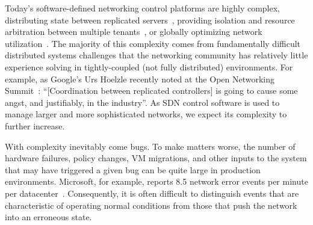 
Today's software-defined networking control platforms are highly complex,
distributing state between replicated
servers~\cite{floodlight},
providing isolation and resource arbitration between multiple
tenants~\cite{Casado:2010:VNF:1921151.1921162}, or
globally optimizing network utilization~\cite{urs_keynote}.
The majority of this complexity comes from
fundamentally difficult distributed systems challenges that the networking community has
relatively little experience
solving in tightly-coupled (not fully distributed) environments.
For example, as Google's Urs H$\ddot{\mathrm{o}}$elzle recently
noted at the Open Networking Summit~\cite{urs_keynote}: ``[Coordination between replicated controllers] is going to
cause some angst, and justifiably, in the industry''. As SDN control software
is used to manage larger and more sophisticated networks,
we expect its complexity to further increase.

With complexity inevitably come
bugs. To make matters worse, the number of hardware failures,
policy changes, VM migrations, and other inputs to the system that may have
triggered a given bug can be quite large in production environments. Microsoft,
for example, reports 8.5 network error events per minute per
datacenter~\cite{Greenberg:2009:VSF:1592568.1592576}.
Consequently, it is often difficult to distinguish events that are
characteristic of operating normal
conditions from those that push the network into an erroneous state.

